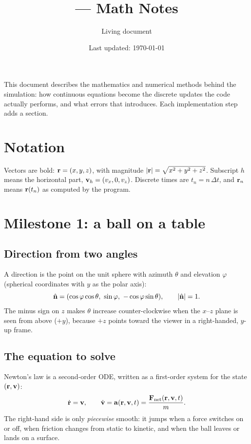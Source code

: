 \documentclass[11pt]{article}
\title{\project{} --- Math Notes}
\author{Living document}
\date{Last updated: \today}
\begin{document}
\maketitle
\noindent This document describes the mathematics and numerical methods behind
the simulation: how continuous equations become the discrete updates the code
actually performs, and what errors that introduces. Each implementation step
adds a section.

\tableofcontents

\section{Notation}
Vectors are bold: $\mathbf{r} = (x,y,z)$, with magnitude $|\mathbf{r}| = \sqrt{x^2+y^2+z^2}$.
Subscript $h$ means the horizontal part, $\mathbf{v}_h = (v_x, 0, v_z)$. Discrete times are
$t_n = n\,\Delta t$, and $\mathbf{r}_n$ means $\mathbf{r}(t_n)$ as computed by the program.

\section{Milestone 1: a ball on a table}

\subsection{Direction from two angles}
A direction is the point on the unit sphere with azimuth $\theta$ and elevation
$\varphi$ (spherical coordinates with $y$ as the polar axis):
\begin{equation}
  \hat{\mathbf{n}} = (\cos\varphi\cos\theta,\ \sin\varphi,\ -\cos\varphi\sin\theta), \qquad |\hat{\mathbf{n}}| = 1.
\end{equation}
The minus sign on $z$ makes $\theta$ increase counter-clockwise when the $x$--$z$ plane is
seen from above ($+y$), because $+z$ points toward the viewer in a right-handed, $y$-up frame.

\subsection{The equation to solve}
Newton's law is a second-order ODE, written as a first-order system for the state $(\mathbf{r},\mathbf{v})$:
\begin{equation}
  \dot{\mathbf{r}} = \mathbf{v}, \qquad \dot{\mathbf{v}} = \mathbf{a}(\mathbf{r},\mathbf{v},t) = \frac{\mathbf{F}_\text{net}(\mathbf{r},\mathbf{v},t)}{m}.
\end{equation}
The right-hand side is only \emph{piecewise} smooth: it jumps when a force switches on or off,
when friction changes from static to kinetic, and when the ball leaves or lands on a surface.
\end{document}

